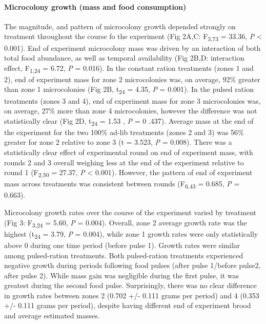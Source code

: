 \documentclass[11pt,]{article}
\let\oldparagraph\paragraph
\renewcommand{\paragraph}[1]{\oldparagraph{#1}\mbox{}}
\begin{document}
\hypertarget{microcolony-growth-mass-and-food-consumption}{%
\paragraph{Microcolony growth (mass and food
consumption)}\label{microcolony-growth-mass-and-food-consumption}}

The magnitude, and pattern of microcolony growth depended strongly on
treatment throughout the course fo the experiment (Fig 2A,C:
F\textsubscript{3,73} = 33.36, \emph{P} \textless{} 0.001). End of
experiment microcolony mass was driven by an interaction of both total
food abundance, as well as temporal availability (Fig 2B,D: interaction
effect, F\textsubscript{1,24} = 6.72, \emph{P} = 0.016). In the constant
ration treatments (zones 1 and 2), end of experiment mass for zone 2
microcolonies was, on average, 92\% greater than zone 1 microcolonies
(Fig 2B, t\textsubscript{24} = 4.35, \emph{P} = 0.001). In the pulsed
ration treatments (zones 3 and 4), end of experiment mass for zone 3
microcolonies was, on average, 27\% more than zone 4 microcolonies,
however the difference was not statistically clear (Fig 2D,
t\textsubscript{24} = 1.53 , \emph{P} = 0 .437). Average mass at the end
of the experiment for the two 100\% ad-lib treatments (zones 2 and 3)
was 56\% greater for zone 2 relative to zone 3 (t = 3.523, \emph{P} =
0.008). There was a statistically clear effect of experimental round on
end of experiment mass, with rounds 2 and 3 overall weighing less at the
end of the experiment relative to round 1 (F\textsubscript{2,50} =
27.37, \emph{P} \textless{} 0.001). However, the pattern of end of
experiment mass across treatments was consistent between rounds
(F\textsubscript{6,43} = 0.685, \emph{P} = 0.663).

Microcolony growth rates over the course of the experiment varied by
treatment (Fig 3: F\textsubscript{3,24} = 5.60, \emph{P} = 0.004).
Overall, zone 2 average growth rate was the highest (t\textsubscript{24}
= 3.79, \emph{P} = 0.004), while zone 1 growth rates were only
statistically above 0 during one time period (before pulse 1). Growth
rates were similar among pulsed-ration treatments. Both pulsed-ration
treatments experienced negative growth during periods following food
pulses (after pulse 1/before pulse2, after pulse 2). While mass gain was
negligible during the first pulse, it was greatest during the second
food pulse. Surprisingly, there was no clear difference in growth rates
between zones 2 (0.702 +/- 0.111 grams per period) and 4 (0.353 +/-
0.111 grams per period), despite having different end of experiment
brood and average estimated masses.
\end{document}
